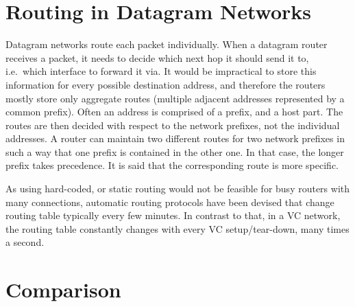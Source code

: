 \documentclass[10pt]{report}
\begin{document}
\section{Routing in Datagram Networks}

Datagram networks route each packet individually.
When a datagram router receives a packet, it needs to decide which next
hop it should send it to, i.e.\ which interface to forward it via.  It
would be impractical to store this information for every possible
destination address, and therefore the routers mostly store only
aggregate routes (multiple adjacent addresses represented by a common
prefix).  Often an address is
comprised of a prefix, and a host part.  The routes are then
decided with respect to the network prefixes, not the individual
addresses.  A router can maintain two different routes for two network
prefixes in such a way that one prefix is contained in the other one.
In that case, the longer prefix takes precedence.  It is said that the
corresponding route is more specific.

As using hard-coded, or static routing would not be feasible for busy
routers with many connections, automatic routing protocols have been
devised that change routing table typically every few minutes.  In
contrast to that, in a VC network, the routing table constantly changes
with every VC setup/tear-down, many times a second.


%

\section{Comparison}
\end{document}
